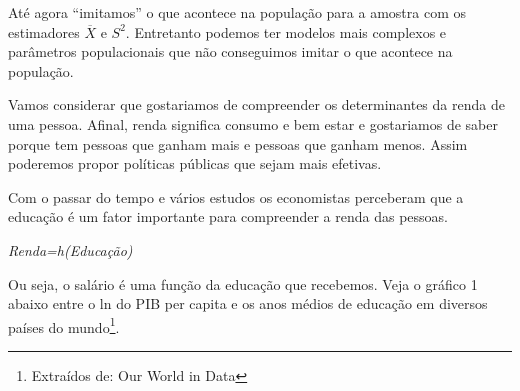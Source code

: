 \documentclass[
  letterpaper,
  DIV=11,
  numbers=noendperiod]{scrartcl}
\begin{document}
Até agora ``imitamos'' o que acontece na população para a amostra com os
estimadores \(\overline{X}\) e \(S^2\). Entretanto podemos ter modelos
mais complexos e parâmetros populacionais que não conseguimos imitar o
que acontece na população.

Vamos considerar que gostariamos de compreender os determinantes da
renda de uma pessoa. Afinal, renda significa consumo e bem estar e
gostariamos de saber porque tem pessoas que ganham mais e pessoas que
ganham menos. Assim poderemos propor políticas públicas que sejam mais
efetivas.

Com o passar do tempo e vários estudos os economistas perceberam que a
educação é um fator importante para compreender a renda das pessoas.\\

\begin{center}
\textit{Renda=h(Educação)}
\end{center}

Ou seja, o salário é uma função da educação que recebemos. Veja o
gráfico 1 abaixo entre o ln do PIB per capita e os anos médios de
educação em diversos países do mundo\footnote{Extraídos de: Our World in
  Data}.
\end{document}
